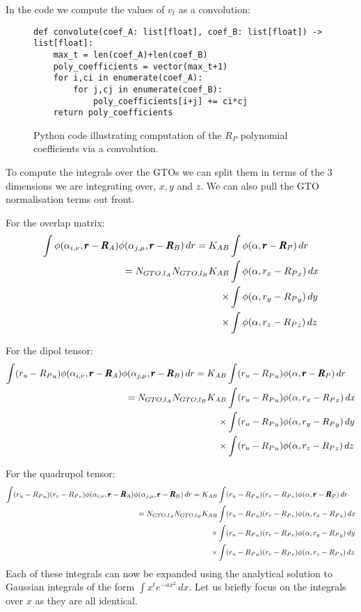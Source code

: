 In the code we compute the values of $v_t$ as a convolution:
\begin{figure}[H]
\begin{verbatim}
def convolute(coef_A: list[float], coef_B: list[float]) -> list[float]:
    max_t = len(coef_A)+len(coef_B)
    poly_coefficients = vector(max_t+1)
    for i,ci in enumerate(coef_A):
        for j,cj in enumerate(coef_B):
            poly_coefficients[i+j] += ci*cj
    return poly_coefficients
\end{verbatim}
    \caption{Python code illustrating computation of the $R_P$ polynomial coefficients via a convolution.}
\end{figure}


To compute the integrals over the GTOs we can split them in terms of the 3 dimensions we are integrating over, $x,y$ and $z$. We can also pull the GTO normalisation terms out front. 

For the overlap matrix:
\begin{align}
        \int \phi(\alpha_{i,\nu},\pmb r-\pmb R_A)\phi(\alpha_{j,\mu},\pmb r-\pmb R_B)\,dr=K_{AB}&\int \phi(\alpha,\pmb r-\pmb R_P)\,dr\\
        =N_{GTO,l_A}N_{GTO,l_B}K_{AB}&\int \phi(\alpha,r_x-{R_P}_x)\,dx\notag\\
            \times&\int \phi(\alpha,r_y-{R_P}_y)\,dy\notag\\
            \times&\int \phi(\alpha,r_z-{R_P}_z)\,dz\notag
\end{align}

For the dipol tensor:
\begin{align}
        \int (r_u-{R_P}_u)\phi(\alpha_{i,\nu},\pmb r-\pmb R_A)\phi(\alpha_{j,\mu},\pmb r-\pmb R_B)\,dr=K_{AB}&\int (r_u-{R_P}_u)\phi(\alpha,\pmb r-\pmb R_P)\,dr\\
        =N_{GTO,l_A}N_{GTO,l_B}K_{AB}&\int (r_u-{R_P}_u)\phi(\alpha,r_x-{R_P}_x)\,dx\notag\\
            \times&\int (r_u-{R_P}_u)\phi(\alpha,r_y-{R_P}_y)\,dy\notag\\
            \times&\int (r_u-{R_P}_u)\phi(\alpha,r_z-{R_P}_z)\,dz\notag
\end{align}

For the quadrupol tensor:
\begin{align}
        \int (r_u-{R_P}_u)(r_v-{R_P}_v)\phi(\alpha_{i,\nu},\pmb r-\pmb R_A)\phi(\alpha_{j,\mu},\pmb r-\pmb R_B)\,dr=K_{AB}&\int (r_u-{R_P}_u)(r_v-{R_P}_v)\phi(\alpha,\pmb r-\pmb R_P)\,dr\\
        =N_{GTO,l_A}N_{GTO,l_B}K_{AB}&\int (r_u-{R_P}_u)(r_v-{R_P}_v)\phi(\alpha,r_x-{R_P}_x)\,dx\notag\\
            \times&\int (r_u-{R_P}_u)(r_v-{R_P}_v)\phi(\alpha,r_y-{R_P}_y)\,dy\notag\\
            \times&\int (r_u-{R_P}_u)(r_v-{R_P}_v)\phi(\alpha,r_z-{R_P}_z)\,dz\notag
\end{align}
Each of these integrals can now be expanded using the analytical solution to Gaussian integrals of the form $\int x^t e^{-ax^2}\,dx$\cite{}. Let us briefly focus on the integrals over $x$ as they are all identical.


